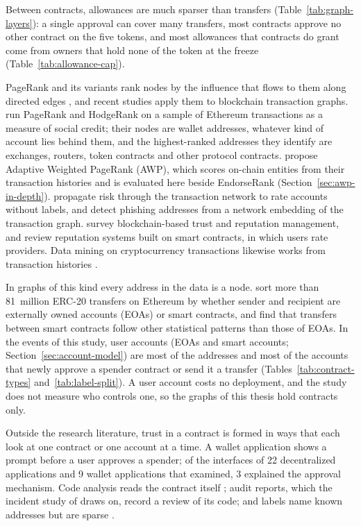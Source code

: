 Between contracts, allowances are much sparser than transfers (Table~\ref{tab:graph-layers}): a single approval can cover many transfers, most contracts approve no other contract on the five tokens, and most allowances that contracts do grant come from owners that hold none of the token at the freeze (Table~\ref{tab:allowance-cap}).


PageRank and its variants rank nodes by the influence that flows to them along directed edges \parencite{page1999pagerank}, and recent studies apply them to blockchain transaction graphs. \textcite{do2023hodgerank} run PageRank and HodgeRank on a sample of Ethereum transactions as a measure of social credit; their nodes are wallet addresses, whatever kind of account lies behind them, and the highest-ranked addresses they identify are exchanges, routers, token contracts and other protocol contracts. \textcite{do2023awp} propose Adaptive Weighted PageRank (AWP), which scores on-chain entities from their transaction histories and is evaluated here beside EndorseRank (Section~\ref{sec:awp-in-depth}). \textcite{lin2025riskprop} propagate risk through the transaction network to rate accounts without labels, and \textcite{wu2022phishers} detect phishing addresses from a network embedding of the transaction graph. \textcite{bellini2020trust} survey blockchain-based trust and reputation management, and \textcite{almasoud2020reputation} review reputation systems built on smart contracts, in which users rate providers. Data mining on cryptocurrency transactions likewise works from transaction histories \parencite{liu2021knowledge}.

In graphs of this kind every address in the data is a node. \textcite{mukhia2026erc20} sort more than 81~million ERC-20 transfers on Ethereum by whether sender and recipient are externally owned accounts (EOAs) or smart contracts, and find that transfers between smart contracts follow other statistical patterns than those of EOAs. In the events of this study, user accounts (EOAs and smart accounts; Section~\ref{sec:account-model}) are most of the addresses and most of the accounts that newly approve a spender contract or send it a transfer (Tables~\ref{tab:contract-types} and~\ref{tab:label-split}). A user account costs no deployment, and the study does not measure who controls one, so the graphs of this thesis hold contracts only.

Outside the research literature, trust in a contract is formed in ways that each look at one contract or one account at a time. A wallet application shows a prompt before a user approves a spender; of the interfaces of 22 decentralized applications and 9 wallet applications that \textcite{wang2022unlimited} examined, 3 explained the approval mechanism. Code analysis reads the contract itself \parencite{lin2024crpwarner}; audit reports, which the incident study of \textcite{zhou2023sok} draws on, record a review of its code; and labels name known addresses but are sparse \parencite{lin2024whoiswho}.

